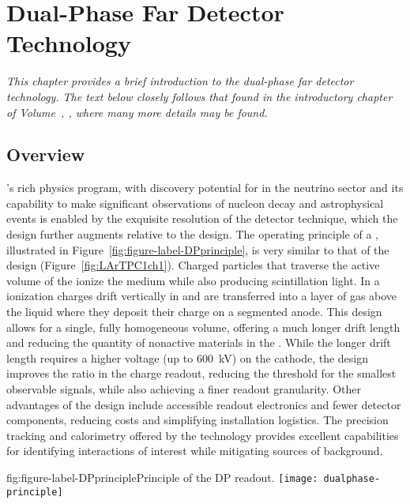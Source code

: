 \chapter{Dual-Phase Far Detector Technology}
\label{ch:exec-dp}

\textit{This chapter provides a brief introduction to the dual-phase far detector technology.  The text below closely follows that found in the introductory chapter of Volume~\volnumberdp{}, \voltitledp{}, where many more details may be found.}


\section{Overview}
\label{sec:dp-execsum-introduction}


's rich physics program, with discovery potential for  in the neutrino sector and its capability to make significant observations of nucleon decay and astrophysical events is enabled by the exquisite resolution of the  detector technique, which the  design further augments relative to the  design. 
The operating principle of a  , illustrated in Figure~\ref{fig:figure-label-DPprinciple}, is very similar to that of the  design (Figure~\ref{fig:LArTPC1ch1}).  Charged particles that traverse the active volume of the  ionize the medium while also producing scintillation light. 
In a  ionization charges drift vertically in  and are transferred
into a layer of gas above the liquid where they deposit their charge on a segmented anode. This design allows for a single, fully homogeneous  volume, offering a much longer drift length and reducing  the quantity of nonactive materials in the .
While the longer drift length requires a higher voltage (up to \SI{600}{kV}) on the cathode, the  design improves the  ratio in the charge readout, reducing the threshold for the smallest observable signals, while also achieving a finer readout granularity.  
Other advantages of the  design include accessible readout electronics and fewer detector components, reducing costs and simplifying installation logistics.
The precision tracking and calorimetry offered by the  technology provides excellent capabilities for identifying interactions of interest while mitigating sources of background.  

\begin{dunefigure}{fig:figure-label-DPprinciple}{Principle of the DP readout.}
\texttt{[image: dualphase-principle]}
\end{dunefigure}

